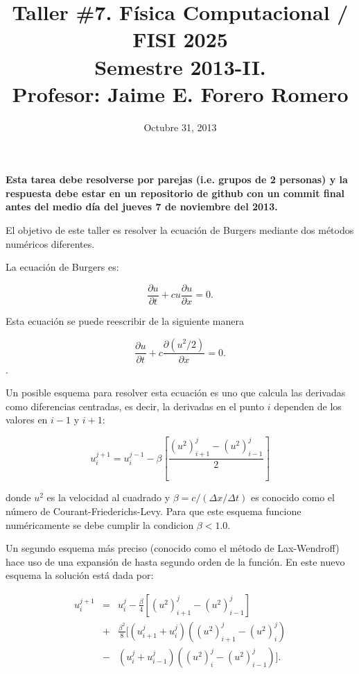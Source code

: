 \documentclass{article}
\title{Taller \#7. F\'isica Computacional / FISI 2025 \\Semestre
  2013-II. \\ Profesor: Jaime E. Forero Romero}
\date{Octubre 31, 2013}
\begin{document}
\maketitle

{\bf Esta tarea debe resolverse por parejas (i.e. grupos de 2
  personas) y la respuesta debe estar en un repositorio de github con
  un commit final antes del medio d\'ia del jueves 7 de noviembre del
  2013.} 

El objetivo de este taller es resolver la ecuaci\'on de Burgers
mediante dos m\'etodos num\'ericos diferentes. 

La ecuaci\'on de Burgers es:

\begin{equation}
\frac{\partial u}{\partial t} +cu\frac{\partial u}{\partial x}=0.
\end{equation}

Esta ecuaci\'on se puede reescribir de la siguiente manera

\begin{equation}
\frac{\partial u}{\partial t} +c\frac{\partial (u^2/2)}{\partial x}=0.
\label{eq:uno}
\end{equation}.

Un posible esquema para resolver esta ecuaci\'on es uno que calcula
las derivadas como diferencias centradas, es decir, la derivadas en el
punto $i$ dependen de los valores en $i-1$ y $i+1$:

\begin{equation}
u_i^{j+1} = u_i^{j-1} - \beta\left[\frac{(u^2)_{i+1}^j - (u^2)_{i-1}^j}{2}\right]
\end{equation}

donde $u^2$ es la velocidad al cuadrado y $\beta=c/(\Delta x/\Delta t)$
es conocido como el n\'umero de Courant-Friederichs-Levy. Para que
este esquema funcione num\'ericamente se debe cumplir la condicion
$\beta<1.0$.

Un segundo esquema m\'as preciso (conocido como el m\'etodo de
Lax-Wendroff) hace uso de una expansi\'on de hasta segundo
orden de la funci\'on. En este nuevo esquema la soluci\'on est\'a dada
por: 

\begin{eqnarray}
u_i^{j+1} &=& u_i^{j} - \frac{\beta}{4}[(u^2)^{j}_{i+1} -
  (u^2)_{i-1}^j]\\ \nonumber
& + &\frac{\beta^2}{8}[(u_{i+1}^j + u_i^j)((u^2)_{i+1}^j -
  (u^2)_{i}^{j})\\\nonumber
& - &(u_i^j+u_{i-1}^j)((u^2)_i^j - (u^2)_{i-1}^j)].
\label{eq:dos}
\end{eqnarray}
\end{document}
